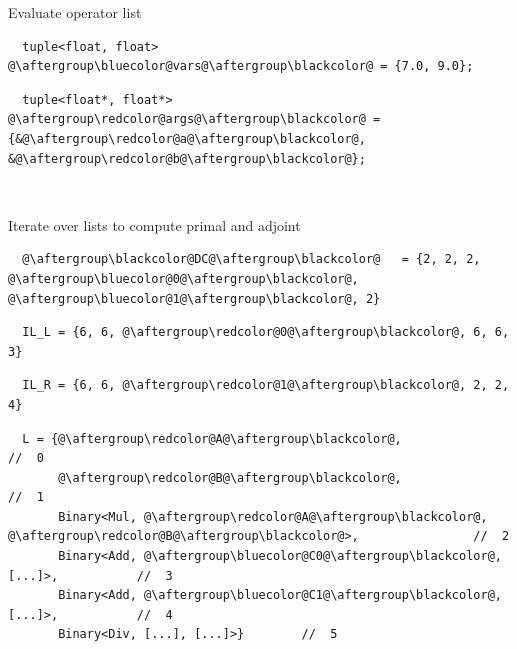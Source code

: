 \documentclass[xcolor=dvipsnames]{beamer}
\begin{document}
\begin{frame}[fragile]{Evaluate operator list}
\begin{lstlisting}
  tuple<float, float>   @\aftergroup\bluecolor@vars@\aftergroup\blackcolor@ = {7.0, 9.0};
\end{lstlisting}
\begin{lstlisting}
  tuple<float*, float*> @\aftergroup\redcolor@args@\aftergroup\blackcolor@ = {&@\aftergroup\redcolor@a@\aftergroup\blackcolor@, &@\aftergroup\redcolor@b@\aftergroup\blackcolor@};
\end{lstlisting}

~

Iterate over lists to compute primal and adjoint
\begin{lstlisting}
  @\aftergroup\blackcolor@DC@\aftergroup\blackcolor@   = {2, 2, 2, @\aftergroup\bluecolor@0@\aftergroup\blackcolor@, @\aftergroup\bluecolor@1@\aftergroup\blackcolor@, 2}
\end{lstlisting}
\begin{lstlisting}
  IL_L = {6, 6, @\aftergroup\redcolor@0@\aftergroup\blackcolor@, 6, 6, 3}
\end{lstlisting}
\begin{lstlisting}
  IL_R = {6, 6, @\aftergroup\redcolor@1@\aftergroup\blackcolor@, 2, 2, 4}
\end{lstlisting}

\begin{lstlisting}
  L = {@\aftergroup\redcolor@A@\aftergroup\blackcolor@,                                //  0
       @\aftergroup\redcolor@B@\aftergroup\blackcolor@,                                //  1
       Binary<Mul, @\aftergroup\redcolor@A@\aftergroup\blackcolor@, @\aftergroup\redcolor@B@\aftergroup\blackcolor@>,                //  2
       Binary<Add, @\aftergroup\bluecolor@C0@\aftergroup\blackcolor@, [...]>,           //  3
       Binary<Add, @\aftergroup\bluecolor@C1@\aftergroup\blackcolor@, [...]>,           //  4
       Binary<Div, [...], [...]>}        //  5
\end{lstlisting}
\end{frame}
\end{document}
